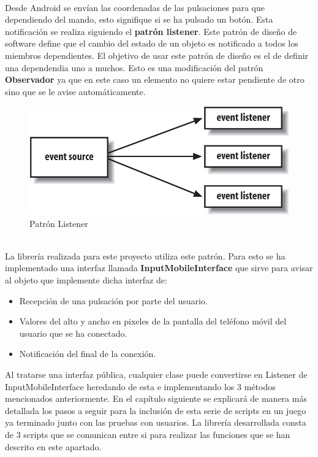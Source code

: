 \\
Desde Android se env\'ian las coordenadas de las pulsaciones para que dependiendo del mando, esto signifique si se ha pulsado un bot\'on. Esta notificaci\'on se realiza siguiendo el \textbf{patr\'on listener}. Este patr\'on de dise\~no de software define que el cambio del estado de un objeto es notificado a todos los miembros dependientes. El objetivo de usar este patr\'on de dise\~no es el de definir una dependendia uno a muchos. Esto es una modificaci\'on del patr\'on \textbf{Observador} ya que en este caso un elemento no quiere estar pendiente de otro sino que se le avise autom\'aticamente. 
\\
\begin{figure}[h]
\centering
\includegraphics[width=1.0\textwidth]{Imagenes/Bitmap/Listener.png}
\caption{Patr\'on Listener}
 \label{Patron_Listener}
\end{figure}
\\
La librer\'ia realizada para este proyecto utiliza este patr\'on. Para esto se ha implementado una interfaz llamada \textbf{InputMobileInterface} que sirve para avisar al objeto que implemente dicha interfaz de:
\begin{itemize}
\item Recepci\'on de una pulsaci\'on por parte del usuario.
\item Valores del alto y ancho en pixeles de la pantalla del tel\'efono m\'ovil del usuario que se ha conectado.
\item Notificaci\'on del final de la conexi\'on.
\end {itemize}
Al tratarse una interfaz p\'ublica, cualquier clase puede convertirse en Listener de InputMobileInterface heredando de esta e implementando los 3 m\'etodos mencionados anteriormente. En el cap\'itulo siguiente se explicar\'a de manera m\'as detallada los pasos a seguir para la inclusi\'on de esta serie de scripts en un juego ya terminado junto con las pruebas con usuarios. La librer\'ia desarrollada consta de 3 scripts que se comunican entre si para realizar las funciones que se han descrito en este apartado.


